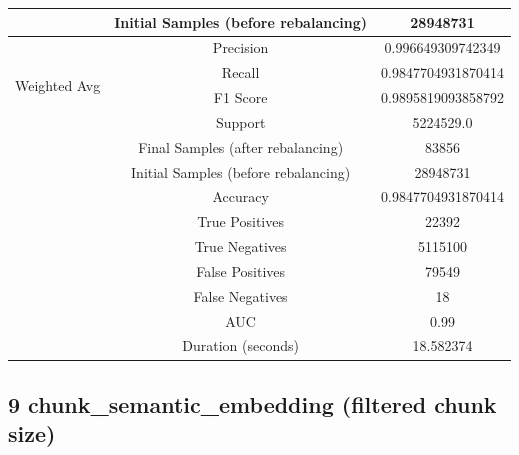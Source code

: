 \begin{longtable}{|c|c|c|}
 & Initial Samples (before rebalancing) & 28948731 \\
\hline
\multirow{4}{*}{Weighted Avg} & Precision & 0.996649309742349 \\
 & Recall & 0.9847704931870414 \\
 & F1 Score & 0.9895819093858792 \\
 & Support & 5224529.0 \\
 & Final Samples (after rebalancing) & 83856 \\
 & Initial Samples (before rebalancing) & 28948731 \\
\hline
& Accuracy & 0.9847704931870414 \\ \hline
& True Positives & 22392 \\ \hline
& True Negatives & 5115100 \\ \hline
& False Positives & 79549 \\ \hline
& False Negatives & 18 \\ \hline
& AUC & 0.99 \\ \hline
& Duration (seconds) & 18.582374 \\ \hline
\end{longtable}


\subsection{9 chunk\_semantic\_embedding (filtered chunk size)}

